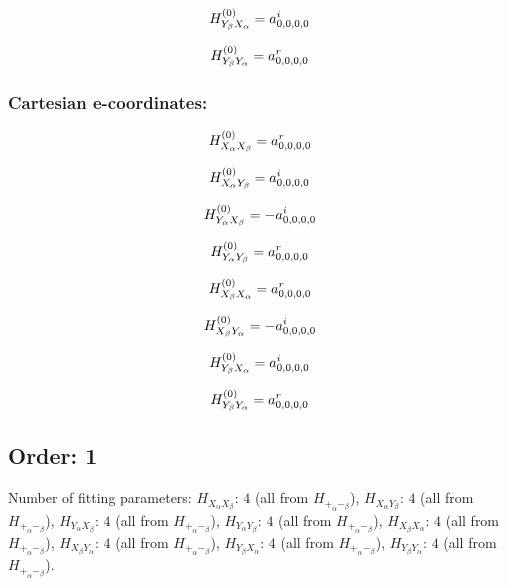 \documentclass[fleqn]{article}
\begin{document}
\begin{dmath*}
H_{Y_{\beta}X_{\alpha}}^{(0)}= a^{i}_{0,0,0,0}\\
\end{dmath*}

\begin{dmath*}
H_{Y_{\beta}Y_{\alpha}}^{(0)}= a^{r}_{0,0,0,0}\\
\end{dmath*}
\subsubsection*{Cartesian e-coordinates:}

\begin{dmath*}
H_{X_{\alpha}X_{\beta}}^{(0)}=a^{r}_{0,0,0,0}\\
\end{dmath*}

\begin{dmath*}
H_{X_{\alpha}Y_{\beta}}^{(0)}= a^{i}_{0,0,0,0}\\
\end{dmath*}

\begin{dmath*}
H_{Y_{\alpha}X_{\beta}}^{(0)}=-  a^{i}_{0,0,0,0}\\
\end{dmath*}

\begin{dmath*}
H_{Y_{\alpha}Y_{\beta}}^{(0)}= a^{r}_{0,0,0,0}\\
\end{dmath*}

\begin{dmath*}
H_{X_{\beta}X_{\alpha}}^{(0)}=a^{r}_{0,0,0,0}\\
\end{dmath*}

\begin{dmath*}
H_{X_{\beta}Y_{\alpha}}^{(0)}=-  a^{i}_{0,0,0,0}\\
\end{dmath*}

\begin{dmath*}
H_{Y_{\beta}X_{\alpha}}^{(0)}= a^{i}_{0,0,0,0}\\
\end{dmath*}

\begin{dmath*}
H_{Y_{\beta}Y_{\alpha}}^{(0)}= a^{r}_{0,0,0,0}\\
\end{dmath*}
\subsection{Order: 1}
Number of fitting parameters: $H_{X_{\alpha}X_{\beta}}$: $4$ (all from $H_{+_{\alpha}-_{\beta}}$), $H_{X_{\alpha}Y_{\beta}}$: $4$ (all from $H_{+_{\alpha}-_{\beta}}$), $H_{Y_{\alpha}X_{\beta}}$: $4$ (all from $H_{+_{\alpha}-_{\beta}}$), $H_{Y_{\alpha}Y_{\beta}}$: $4$ (all from $H_{+_{\alpha}-_{\beta}}$), $H_{X_{\beta}X_{\alpha}}$: $4$ (all from $H_{+_{\alpha}-_{\beta}}$), $H_{X_{\beta}Y_{\alpha}}$: $4$ (all from $H_{+_{\alpha}-_{\beta}}$), $H_{Y_{\beta}X_{\alpha}}$: $4$ (all from $H_{+_{\alpha}-_{\beta}}$), $H_{Y_{\beta}Y_{\alpha}}$: $4$ (all from $H_{+_{\alpha}-_{\beta}}$).
\end{document}
